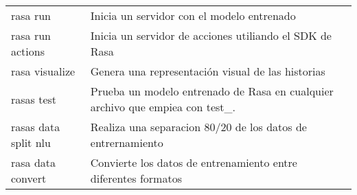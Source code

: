\begin{appendices}
\begin{table}[h]
{\begin{tabular}{|l|l|l}
\multirow{2}{*}{rasa run}              & \multirow{2}{*}{Inicia un servidor con el modelo entrenado}                                                                             &  \\
                                       &                                                                                                                                         &  \\ \cline{1-2}
\multirow{2}{*}{rasa run actions}      & \multirow{2}{*}{Inicia un servidor de acciones utiliando el SDK de Rasa}                                                                &  \\
                                       &                                                                                                                                         &  \\ \cline{1-2}
\multirow{2}{*}{rasa visualize}        & \multirow{2}{*}{Genera una representación visual de las historias}                                                                      &  \\
                                       &                                                                                                                                         &  \\ \cline{1-2}
\multirow{2}{*}{rasas test}            & \multirow{2}{*}{Prueba un modelo entrenado de Rasa en cualquier archivo que empiea con test\_.}                                         &  \\
                                       &                                                                                                                                         &  \\ \cline{1-2}
\multirow{2}{*}{rasas data split nlu}  & \multirow{2}{*}{Realiza una separacion 80/20 de los datos de entrernamiento}                                                            &  \\
                                       &                                                                                                                                         &  \\ \cline{1-2}
\multirow{2}{*}{rasa data convert}     & \multirow{2}{*}{Convierte los datos de entrenamiento entre diferentes formatos}                                                         &  \\
                                       &                                                                                                                                         &  \\ \cline{1-2}

\end{tabular}}
\end{table}
\end{appendices}
